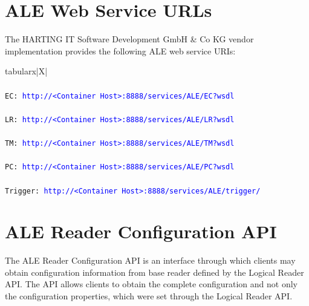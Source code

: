 \documentclass[11pt,a4paper,oneside]{article}
\newif\ifincludecc
\newif\ifincluderc
\newenvironment{bbox}%
{\begin{table}[h!]\begin{threeparttable}}%
{\end{threeparttable}\end{table}\FloatBarrier}
\newenvironment{bbox}
{\ifvmode\IgnorePar\fi \EndP\Tg<div class='bbox'>}{\Tg</div>\IgnoreIndent}
\begin{document}

\section{ALE Web Service URLs}

The HARTING IT Software Development GmbH \& Co KG vendor implementation provides the following ALE web service URIs:

\begin{bbox}
\begin{edtable}{tabularx}{\linewidth}{|X|}
\hline 
{}
\\
\\
\texttt{EC: \textcolor{blue}{http://<Container Host>:8888/services/ALE/EC?wsdl}}\\
\texttt{\textendash \textendash \textendash}\\
\texttt{LR: \textcolor{blue}{http://<Container Host>:8888/services/ALE/LR?wsdl}}\\
\texttt{\textendash \textendash \textendash}\\
\texttt{TM: \textcolor{blue}{http://<Container Host>:8888/services/ALE/TM?wsdl}}\\
\texttt{\textendash \textendash \textendash}\\
\ifincludecc
\texttt{CC: \textcolor{blue}{http://<Container Host>:8888/services/ALE/CC?wsdl}}\\
\texttt{\textendash \textendash \textendash}\\
\fi
\texttt{PC: \textcolor{blue}{http://<Container Host>:8888/services/ALE/PC?wsdl}}\\
\texttt{\textendash \textendash \textendash}\\
\texttt{Trigger: \textcolor{blue}{http://<Container Host>:8888/services/ALE/trigger/}}\\
\hline
\end{edtable}
\end{bbox}

\ifincluderc
\section{ALE Reader Configuration API}
\label{subsec:ALEReader}
The ALE Reader Configuration API is an interface through which clients may obtain configuration information from base reader defined by the Logical Reader API. The API allows clients to obtain the complete configuration and not only the configuration properties, which were set through the Logical Reader API.
\end{document}
